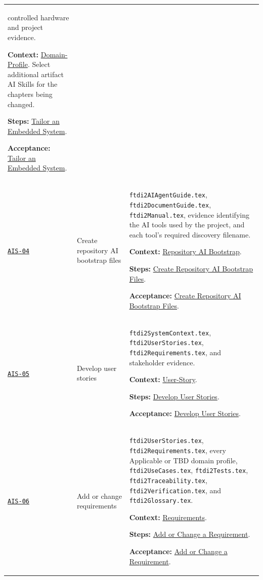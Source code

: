 \begin{tabularx}{\linewidth}{L{1.6cm}L{3.1cm}Y}
controlled hardware and project evidence.\par\textbf{Context:} \hyperref[Section:AIDomainContext]{Domain-Profile}. Select additional artifact AI Skills for the chapters being changed.\par\textbf{Steps:} \hyperref[Section:AIEmbeddedTaskSteps]{Tailor an Embedded System}.\par\textbf{Acceptance:} \hyperref[Section:AIEmbeddedAcceptance]{Tailor an Embedded System}.\\
\label{Skill:AIS-04}\hyperref[Section:AIBootstrapSteps]{\texttt{AIS-04}} & Create repository AI bootstrap files & \texttt{ftdi2AIAgentGuide.tex},
\texttt{ftdi2DocumentGuide.tex}, \texttt{ftdi2Manual.tex}, evidence identifying the
AI tools used by the project, and each tool's required discovery filename.\par\textbf{Context:} \hyperref[Section:AIRepositoryBootstrap]{Repository AI Bootstrap}.\par\textbf{Steps:} \hyperref[Section:AIBootstrapTaskSteps]{Create Repository AI Bootstrap Files}.\par\textbf{Acceptance:} \hyperref[Section:AIBootstrapAcceptance]{Create Repository AI Bootstrap Files}.\\
\label{Skill:AIS-05}\hyperref[Section:AIStorySteps]{\texttt{AIS-05}} & Develop user stories & \texttt{ftdi2SystemContext.tex}, \texttt{ftdi2UserStories.tex}, \texttt{ftdi2Requirements.tex}, and stakeholder evidence.\par\textbf{Context:} \hyperref[Section:AIUserStoryContext]{User-Story}.\par\textbf{Steps:} \hyperref[Section:AIStoryTaskSteps]{Develop User Stories}.\par\textbf{Acceptance:} \hyperref[Section:AIStoryAcceptance]{Develop User Stories}.\\
\label{Skill:AIS-06}\hyperref[Section:AIRequirementSteps]{\texttt{AIS-06}} & Add or change requirements & \texttt{ftdi2UserStories.tex}, \texttt{ftdi2Requirements.tex}, every Applicable or TBD domain profile, \texttt{ftdi2UseCases.tex}, \texttt{ftdi2Tests.tex}, \texttt{ftdi2Traceability.tex}, \texttt{ftdi2Verification.tex}, and \texttt{ftdi2Glossary.tex}.\par\textbf{Context:} \hyperref[Section:AIRequirementsContext]{Requirements}.\par\textbf{Steps:} \hyperref[Section:AIRequirementTaskSteps]{Add or Change a Requirement}.\par\textbf{Acceptance:} \hyperref[Section:AIRequirementAcceptance]{Add or Change a Requirement}.\\

\end{tabularx}
